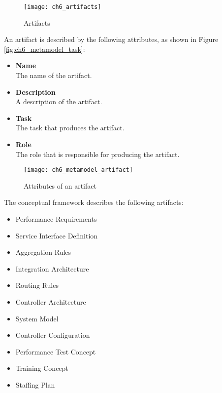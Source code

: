 \begin{figure}[htpb] \centering 
	\texttt{[image: ch6\_artifacts]} 
	\caption{Artifacts} 
	\label{fig:ch6_artifacts} 
\end{figure}

An artifact is described by the following attributes, as shown in Figure \ref{fig:ch6_metamodel_task}:
\begin{itemize}
	\item \textbf{Name}\\
	The name of the artifact.
	\item \textbf{Description}\\
	A description of the artifact.
	\item \textbf{Task}\\
	The task that produces the artifact.
	\item \textbf{Role}\\
	The role that is responsible for producing the artifact.
\end{itemize}

\begin{figure}[htpb] \centering 
	\texttt{[image: ch6\_metamodel\_artifact]} 
	\caption{Attributes of an artifact} 
	\label{fig:ch6_metamodel_artifact} 
\end{figure}

The conceptual framework describes the following artifacts:

\begin{itemize}
	\item Performance Requirements
	\item Service Interface Definition
	\item Aggregation Rules
	\item Integration Architecture
	\item Routing Rules
	\item Controller Architecture
	\item System Model
	\item Controller Configuration
	\item Performance Test Concept
	\item Training Concept
	\item Staffing Plan
\end{itemize}

